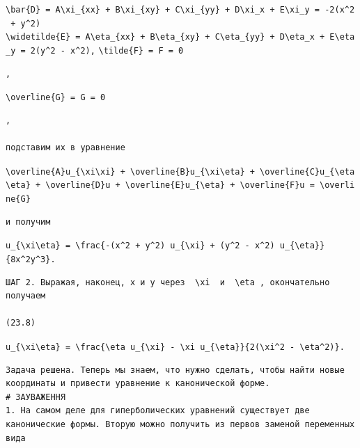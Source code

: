 \documentclass[
  ukrainian,
]{article}
\begin{document}
\texttt{\textbackslash{}bar\{D\}\ =\ A\textbackslash{}xi\_\{xx\}\ +\ B\textbackslash{}xi\_\{xy\}\ +\ C\textbackslash{}xi\_\{yy\}\ +\ D\textbackslash{}xi\_x\ +\ E\textbackslash{}xi\_y\ =\ -2(x\^{}2\ +\ y\^{}2)}
\texttt{\textbackslash{}widetilde\{E\}\ =\ A\textbackslash{}eta\_\{xx\}\ +\ B\textbackslash{}eta\_\{xy\}\ +\ C\textbackslash{}eta\_\{yy\}\ +\ D\textbackslash{}eta\_x\ +\ E\textbackslash{}eta\_y\ =\ 2(y\^{}2\ -\ x\^{}2),}
\texttt{\textbackslash{}tilde\{F\}\ =\ F\ =\ 0}

\begin{verbatim}
,
\end{verbatim}

\texttt{\textbackslash{}overline\{G\}\ =\ G\ =\ 0}

\begin{verbatim}
,

подставим их в уравнение
\end{verbatim}

\texttt{\textbackslash{}overline\{A\}u\_\{\textbackslash{}xi\textbackslash{}xi\}\ +\ \textbackslash{}overline\{B\}u\_\{\textbackslash{}xi\textbackslash{}eta\}\ +\ \textbackslash{}overline\{C\}u\_\{\textbackslash{}eta\textbackslash{}eta\}\ +\ \textbackslash{}overline\{D\}u\ +\ \textbackslash{}overline\{E\}u\_\{\textbackslash{}eta\}\ +\ \textbackslash{}overline\{F\}u\ =\ \textbackslash{}overline\{G\}}

\begin{verbatim}
и получим
\end{verbatim}

\texttt{u\_\{\textbackslash{}xi\textbackslash{}eta\}\ =\ \textbackslash{}frac\{-(x\^{}2\ +\ y\^{}2)\ u\_\{\textbackslash{}xi\}\ +\ (y\^{}2\ -\ x\^{}2)\ u\_\{\textbackslash{}eta\}\}\{8x\^{}2y\^{}3\}.}

\begin{verbatim}
ШАГ 2. Выражая, наконец, x и y через  \xi  и  \eta , окончательно получаем

(23.8)
\end{verbatim}

\texttt{u\_\{\textbackslash{}xi\textbackslash{}eta\}\ =\ \textbackslash{}frac\{\textbackslash{}eta\ u\_\{\textbackslash{}xi\}\ -\ \textbackslash{}xi\ u\_\{\textbackslash{}eta\}\}\{2(\textbackslash{}xi\^{}2\ -\ \textbackslash{}eta\^{}2)\}.}

\begin{verbatim}
Задача решена. Теперь мы знаем, что нужно сделать, чтобы найти новые координаты и привести уравнение к канонической форме.
# ЗАУВАЖЕННЯ
1. На самом деле для гиперболических уравнений существует две канонические формы. Вторую можно получить из первов заменой переменных вида
\end{verbatim}
\end{document}
